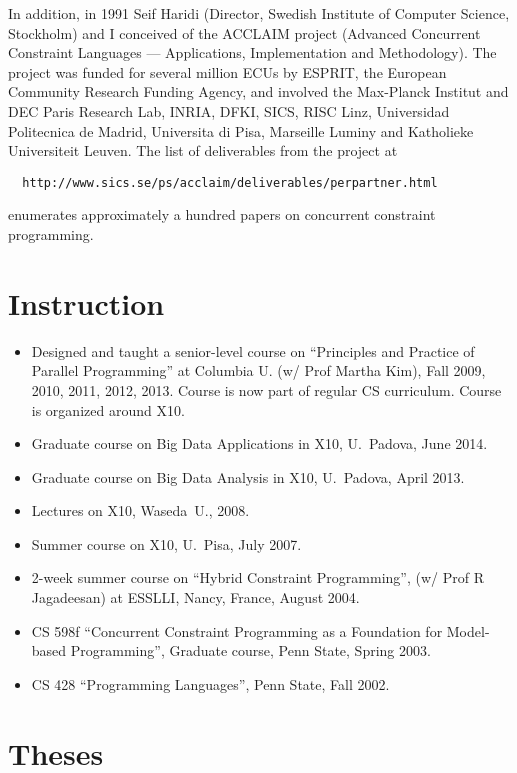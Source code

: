 \documentclass{article}
\begin{document}
In addition, in 1991 Seif Haridi (Director, Swedish Institute of
Computer Science, Stockholm) and I conceived of the \textsc{ ACCLAIM} project
(Advanced Concurrent Constraint Languages --- Applications,
Implementation and Methodology). The project was funded for several
million ECUs by ESPRIT, the European Community Research Funding
Agency, and involved the Max-Planck Institut and DEC Paris Research
Lab, INRIA, DFKI, SICS, RISC Linz, Universidad Politecnica de Madrid,
Universita di Pisa, Marseille Luminy and Katholieke Universiteit
Leuven. The list of deliverables from the project at
\begin{verbatim}
  http://www.sics.se/ps/acclaim/deliverables/perpartner.html
\end{verbatim}
enumerates approximately a hundred papers on concurrent constraint
programming.

\section*{Instruction}
\begin{itemize}

 \item Designed and taught a senior-level course on ``Principles and
   Practice of Parallel Programming'' at Columbia U. (w/ Prof Martha
   Kim), Fall 2009, 2010, 2011, 2012, 2013. Course is now part of regular CS
   curriculum. Course is organized around X10.
 \item Graduate course on Big Data Applications in X10, U.~Padova, June 2014.
 \item Graduate course on Big Data Analysis in X10, U.~Padova, April 2013.
 \item Lectures on X10, Waseda~U., 2008.
 \item Summer course on X10, U.~Pisa, July 2007.
  \item 2-week summer course on ``Hybrid Constraint Programming'', (w/
  Prof R Jagadeesan) at ESSLLI, Nancy, France, August 2004.
  \item CS 598f ``Concurrent Constraint Programming as a Foundation
  for Model-based Programming'', Graduate course, Penn State, Spring
  2003.
  \item CS 428 ``Programming Languages'', Penn State, Fall 2002.
\end{itemize}
\section*{Theses}
\end{document}
